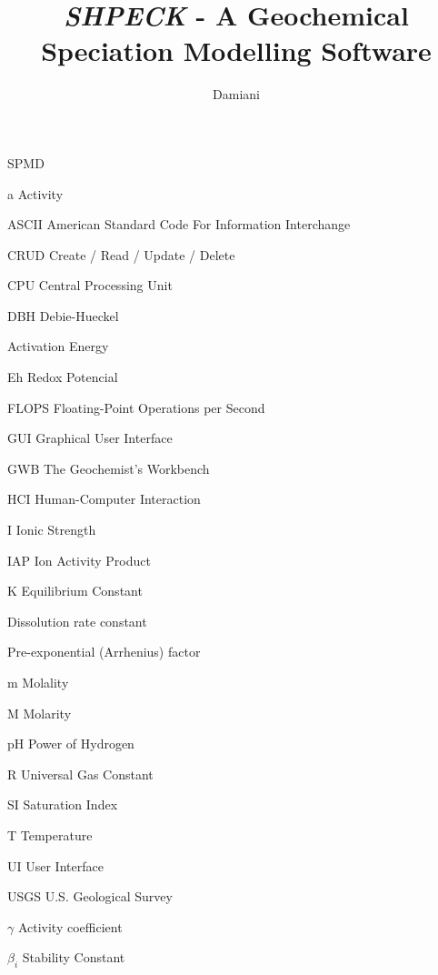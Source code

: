 \documentclass[ppgc,mestrado,english]{iiufrgs}
\title{\emph{SHPECK} - A Geochemical Speciation Modelling Software}
\author{Damiani}{Leonardo Hax}
\begin{document}
	
\renewcommand{\lstlistingname}{Code}

\maketitle

\clearpage
\begin{flushright}
\mbox{}\vfill
\end{flushright}

\renewcommand*\contentsname{Summary}
\tableofcontents



\begin{listofabbrv}{SPMD}
\item[a] Activity
\item[ASCII] American Standard Code For Information Interchange
\item[CRUD] Create / Read / Update / Delete
\item[CPU] Central Processing Unit
\item[DBH] Debie-Hueckel 
\item[\ce{E_a}] Activation Energy
\item[Eh] Redox Potencial
\item[FLOPS] Floating-Point Operations per Second
\item[GUI] Graphical User Interface
\item[GWB] The Geochemist's Workbench
\item[HCI] Human-Computer Interaction        
\item[I] Ionic Strength
\item[IAP] Ion Activity Product 
\item[K] Equilibrium Constant        
\item[\ce{k_{diss}}] Dissolution rate constant
\item[\ce{k_0}] Pre-exponential (Arrhenius) factor
\item[m] Molality
\item[M] Molarity
\item[pH] Power of Hydrogen
\item[R] Universal Gas Constant
\item[SI] Saturation Index 
\item[T] Temperature
\item[UI] User Interface
\item[USGS] U.S. Geological Survey
\item[$\gamma$] Activity coefficient
\item[$\beta_i$] Stability Constant         
\end{listofabbrv}
\end{document}

